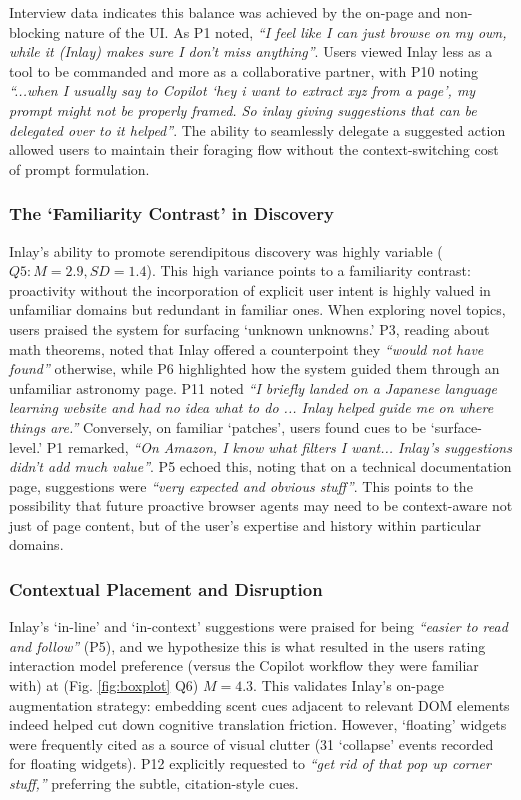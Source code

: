 \documentclass[sigconf]{acmart}
\begin{document}
Interview data indicates this balance was achieved by the on-page and non-blocking nature of the UI. As P1 noted, \textit{``I feel like I can just browse on my own, while it (Inlay) makes sure I don't miss anything''}. Users viewed Inlay less as a tool to be commanded and more as a collaborative partner, with P10 noting \textit{``...when I usually say to Copilot `hey i want to extract xyz from a page', my prompt might not be properly framed. So inlay giving suggestions that can be delegated over to it helped''}. The ability to seamlessly delegate a suggested action allowed users to maintain their foraging flow without the context-switching cost of prompt formulation.




\subsubsection{The `Familiarity Contrast' in Discovery}
Inlay's ability to promote serendipitous discovery was highly variable ($Q5: M=2.9, SD=1.4$). This high variance points to a {familiarity contrast}: proactivity without the incorporation of explicit user intent is highly valued in unfamiliar domains but redundant in familiar ones. When exploring novel topics, users praised the system for surfacing `unknown unknowns.' P3, reading about math theorems, noted that Inlay offered a counterpoint they \textit{``would not have found''} otherwise, while P6 highlighted how the system guided them through an unfamiliar astronomy page. P11 noted \textit{``I briefly landed on a Japanese language learning website and had no idea what to do ... Inlay helped guide me on where things are.''} Conversely, on familiar `patches', users found cues to be `surface-level.' P1 remarked, \textit{``On Amazon, I know what filters I want... Inlay's suggestions didn't add much value''}. P5 echoed this, noting that on a technical documentation page, suggestions were \textit{``very expected and obvious stuff''}.
This points to the possibility that future proactive browser agents may need to be context-aware not just of page content, but of the user's expertise and history within particular domains.




\subsubsection{Contextual Placement and Disruption}
Inlay's `in-line' and `in-context' suggestions were praised for being \textit{``easier to read and follow''} (P5), and we hypothesize this is what resulted in the users rating interaction model preference (versus the Copilot workflow they were familiar with) at (Fig. \ref{fig:boxplot} Q6) $M=4.3$. This validates Inlay's on-page augmentation strategy: embedding scent cues adjacent to relevant DOM elements indeed helped cut down cognitive translation friction. However, `floating' widgets were frequently cited as a source of visual clutter (31 `collapse' events recorded for floating widgets). P12 explicitly requested to \textit{``get rid of that pop up corner stuff,''} preferring the subtle, citation-style cues. 
\end{document}
